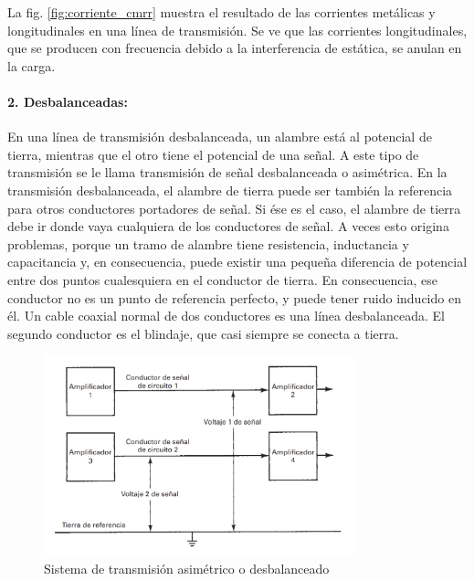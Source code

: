             La fig. \ref{fig:corriente_cmrr} muestra el resultado de las corrientes metálicas y longitudinales en una línea de transmisión. Se ve que las corrientes longitudinales, que se producen con frecuencia debido a la interferencia de estática, se anulan en la carga.

            \paragraph{2. Desbalanceadas:}

            En una línea de transmisión desbalanceada, un alambre está al potencial de tierra, mientras que el otro tiene el potencial de una señal. A este tipo de transmisión se le llama transmisión de señal desbalanceada o asimétrica. En la transmisión desbalanceada, el alambre de tierra puede ser también la referencia para otros conductores portadores de señal. Si ése es el caso, el alambre de tierra debe ir donde vaya cualquiera de los conductores de señal. A veces esto origina problemas, porque un tramo de alambre tiene resistencia, inductancia y capacitancia y, en consecuencia, puede existir una pequeña diferencia de potencial entre dos puntos cualesquiera en el conductor de tierra. En consecuencia, ese conductor no es un punto de referencia perfecto, y puede tener ruido inducido en él. Un cable coaxial normal de dos conductores es una línea desbalanceada. El segundo conductor es el blindaje, que casi siempre se conecta a tierra.

            \begin{figure}[H]
                \centering
                \includegraphics[width=0.8\textwidth]{imagenes/desbalanceado.png}
                \caption{Sistema de transmisión asimétrico o desbalanceado}
                \label{fig:desbalanceado}
            \end{figure}

